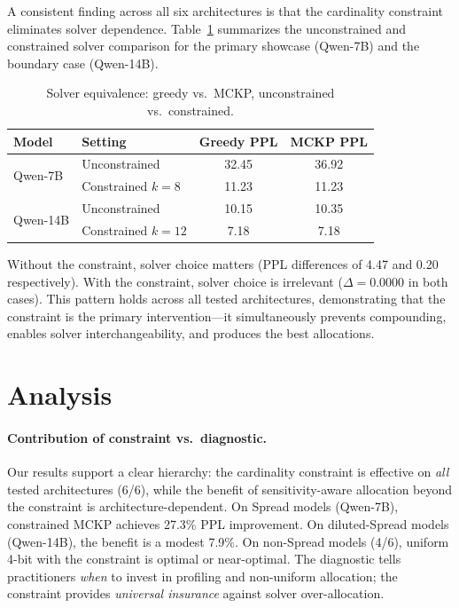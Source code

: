 \documentclass[11pt,a4paper]{article}
\begin{document}
A consistent finding across all six architectures is that the cardinality constraint eliminates solver dependence.
Table~\ref{tab:solver_equiv} summarizes the unconstrained and constrained solver comparison for the primary showcase (Qwen-7B) and the boundary case (Qwen-14B).

\begin{table}[t]
\centering
\caption{Solver equivalence: greedy vs.\ MCKP, unconstrained vs.\ constrained.}
\label{tab:solver_equiv}
\begin{tabular}{llcc}
\toprule
Model & Setting & Greedy PPL & MCKP PPL \\
\midrule
\multirow{2}{*}{Qwen-7B}  & Unconstrained    & 32.45 & 36.92 \\
                            & Constrained $k{=}8$ & 11.23 & 11.23 \\
\midrule
\multirow{2}{*}{Qwen-14B} & Unconstrained    & 10.15 & 10.35 \\
                            & Constrained $k{=}12$ & 7.18  & 7.18 \\
\bottomrule
\end{tabular}
\end{table}

Without the constraint, solver choice matters (PPL differences of 4.47 and 0.20 respectively).
With the constraint, solver choice is irrelevant ($\Delta = 0.0000$ in both cases).
This pattern holds across all tested architectures, demonstrating that the constraint is the primary intervention---it simultaneously prevents compounding, enables solver interchangeability, and produces the best allocations.

\section{Analysis}

\paragraph{Contribution of constraint vs.\ diagnostic.}
Our results support a clear hierarchy: the cardinality constraint is effective on \emph{all} tested architectures (6/6), while the benefit of sensitivity-aware allocation beyond the constraint is architecture-dependent.
On Spread models (Qwen-7B), constrained MCKP achieves 27.3\% PPL improvement.
On diluted-Spread models (Qwen-14B), the benefit is a modest 7.9\%.
On non-Spread models (4/6), uniform 4-bit with the constraint is optimal or near-optimal.
The diagnostic tells practitioners \emph{when} to invest in profiling and non-uniform allocation; the constraint provides \emph{universal insurance} against solver over-allocation.
\end{document}

